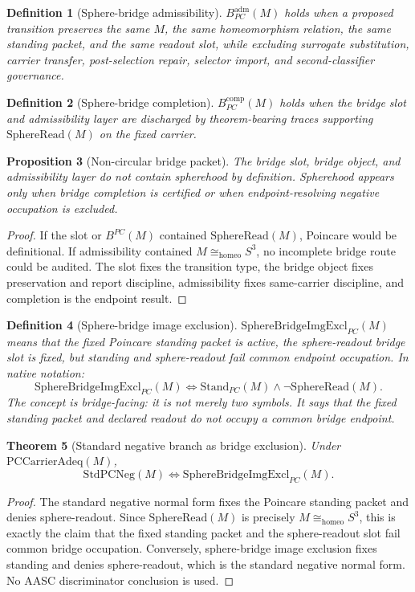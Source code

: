 \documentclass[11pt]{article}
\newtheorem{theorem}{Theorem}[section]
\newtheorem{proposition}[theorem]{Proposition}
\newtheorem{definition}[theorem]{Definition}
\newcommand{\Sthree}{S^{3}}
\newcommand{\StandPC}{\mathrm{Stand}_{PC}}
\newcommand{\SphereRead}{\mathrm{SphereRead}}
\newcommand{\StdPCNeg}{\mathrm{StdPCNeg}}
\newcommand{\SphereBridgeImgExcl}{\mathrm{SphereBridgeImgExcl}_{PC}}
\newcommand{\BridgeCompPC}{B^{\mathrm{comp}}_{PC}}
\newcommand{\BridgeObjPC}{B^{PC}}
\newcommand{\Homeo}{\cong_{\mathrm{homeo}}}
\begin{document}
\begin{definition}[Sphere-bridge admissibility]
\(B^{\mathrm{adm}}_{PC}(M)\) holds when a proposed transition preserves the same \(M\), the same homeomorphism relation, the same standing packet, and the same readout slot, while excluding surrogate substitution, carrier transfer, post-selection repair, selector import, and second-classifier governance.
\end{definition}

\begin{definition}[Sphere-bridge completion]
\(\BridgeCompPC(M)\) holds when the bridge slot and admissibility layer are discharged by theorem-bearing traces supporting \(\SphereRead(M)\) on the fixed carrier.
\end{definition}

\begin{proposition}[Non-circular bridge packet]\label{prop:bridge-noncircular}
The bridge slot, bridge object, and admissibility layer do not contain spherehood by definition. Spherehood appears only when bridge completion is certified or when endpoint-resolving negative occupation is excluded.
\end{proposition}
\begin{proof}
If the slot or \(\BridgeObjPC(M)\) contained \(\SphereRead(M)\), Poincare would be definitional. If admissibility contained \(M\Homeo\Sthree\), no incomplete bridge route could be audited. The slot fixes the transition type, the bridge object fixes preservation and report discipline, admissibility fixes same-carrier discipline, and completion is the endpoint result.
\end{proof}

\begin{definition}[Sphere-bridge image exclusion]
\(\SphereBridgeImgExcl(M)\) means that the fixed Poincare standing packet is active, the sphere-readout bridge slot is fixed, but standing and sphere-readout fail common endpoint occupation. In native notation:
\[
\SphereBridgeImgExcl(M)\Longleftrightarrow \StandPC(M)\wedge\neg\SphereRead(M).
\]
The concept is bridge-facing: it is not merely two symbols. It says that the fixed standing packet and declared readout do not occupy a common bridge endpoint.
\end{definition}

\begin{theorem}[Standard negative branch as bridge exclusion]\label{thm:stdneg-bridge-excl}
Under \(\mathrm{PCCarrierAdeq}(M)\),
\[
\StdPCNeg(M)\Longleftrightarrow \SphereBridgeImgExcl(M).
\]
\end{theorem}
\begin{proof}
The standard negative normal form fixes the Poincare standing packet and denies sphere-readout. Since \(\SphereRead(M)\) is precisely \(M\Homeo\Sthree\), this is exactly the claim that the fixed standing packet and the sphere-readout slot fail common bridge occupation. Conversely, sphere-bridge image exclusion fixes standing and denies sphere-readout, which is the standard negative normal form. No AASC discriminator conclusion is used.
\end{proof}
\end{document}
